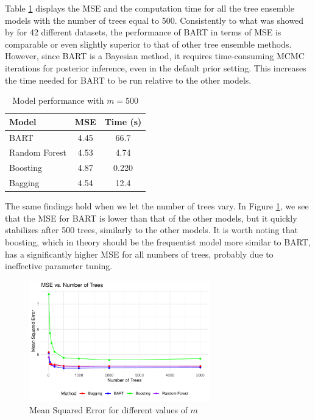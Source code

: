 \documentclass[a4paper,11pt]{article}
\begin{document}
Table \ref{table2} displays the MSE and the computation time for all the tree ensemble models with the number of trees equal to 500. Consistently to what was showed by \cite{chipmanBARTBayesianAdditive2010} for 42 different datasets, the performance of BART in terms of MSE is comparable or even slightly superior to that of other tree ensemble methods. However, since BART is a Bayesian method, it requires time-consuming MCMC iterations for posterior inference, even in the default prior setting. This increases the time needed for BART to be run relative to the other models.
\begin{table}[h]
  \centering
  \begin{tabular}{lcc}
  \toprule
  Model           & MSE & Time (s) \\
  \midrule
  BART            & 4.45    & 66.7  \\
  Random Forest   & 4.53    & 4.74  \\
  Boosting        & 4.87    & 0.220 \\
  Bagging         & 4.54    & 12.4  \\
  \bottomrule
  \end{tabular}
  \caption{Model performance with $m=500$} \label{table2}
  \end{table}






The same findings hold when we let the number of trees vary. In Figure \ref{plot_mse}, we see that the MSE for BART is lower than that of the other models, but it quickly stabilizes after 500 trees, similarly to the other models. It is worth noting that boosting, which in theory should be the frequentist model more similar to BART, has a significantly higher MSE for all numbers of trees, probably due to ineffective parameter tuning.
\begin{figure}[h]
  \centering
  \includegraphics[width=0.7\textwidth]{outputs/mse_plot.pdf}
  \caption{Mean Squared Error for different values of $m$}
  \label{plot_mse}
\end{figure}
\end{document}
